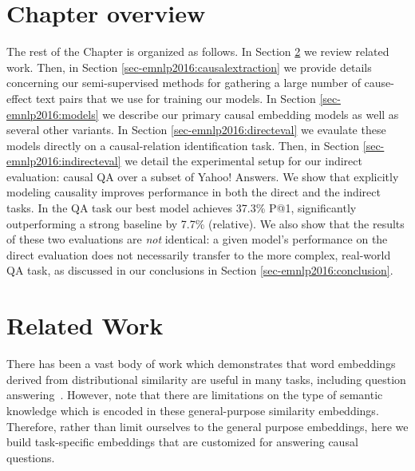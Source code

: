 
\section{Chapter overview}

The rest of the Chapter is organized as follows.  In Section \ref{sec-emnlp2016:relatedwork} we review related work.
Then, in Section \ref{sec-emnlp2016:causalextraction} we provide details concerning our semi-supervised methods for gathering a large number of cause-effect text pairs that we use for training our models.  In Section \ref{sec-emnlp2016:models} we describe our primary causal embedding models as well as several other variants.  In Section \ref{sec-emnlp2016:directeval} we evaulate these models directly on a causal-relation identification task.  Then, in Section \ref{sec-emnlp2016:indirecteval} we detail the experimental setup for our indirect evaluation: causal QA over a subset of Yahoo! Answers.  We show that explicitly modeling causality improves performance in both the direct and the indirect tasks. In the QA task our best model achieves 37.3\% P@1, significantly outperforming a strong baseline by 7.7\% (relative).
We also show that the results of these two evaluations are \emph{not} identical: a given model's performance on the direct evaluation does not necessarily transfer to the more complex, real-world QA task, as discussed in our conclusions in Section \ref{sec-emnlp2016:conclusion}.


\section{Related Work}
\label{sec-emnlp2016:relatedwork} 


There has been a vast body of work which demonstrates that word embeddings derived from distributional similarity are useful in many tasks, including question answering~\mbox{\citep[see \emph{inter alia}][]{fried2015higher,yih13}}.  However, \citet{levy2015supervised} note that there are limitations on the type of semantic knowledge which is encoded in these general-purpose similarity embeddings.  Therefore, rather than limit ourselves to the general purpose embeddings, here we build task-specific embeddings that are customized for answering causal questions.

